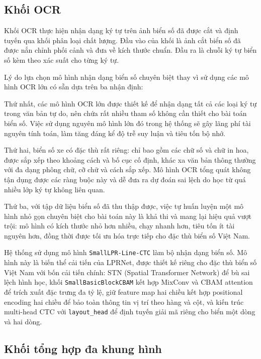 \documentclass[../DoAn.tex]{subfiles}
\begin{document}
\subsection{Khối OCR}
\label{subsection:3.1.ocr}

Khối OCR thực hiện nhận dạng ký tự trên ảnh biển số đã được cắt và định tuyến qua khối phân loại chất lượng. Đầu vào của khối là ảnh cắt biển số đã được nắn chỉnh phối cảnh và đưa về kích thước chuẩn. Đầu ra là chuỗi ký tự biển số kèm theo xác suất cho từng ký tự.

Lý do lựa chọn mô hình nhận dạng biển số chuyên biệt thay vì sử dụng các mô hình OCR lớn có sẵn dựa trên ba nhận định:

Thứ nhất, các mô hình OCR lớn được thiết kế để nhận dạng tất cả các loại ký tự trong văn bản tự do, nên chứa rất nhiều tham số không cần thiết cho bài toán biển số. Việc sử dụng nguyên mô hình lớn đó trong hệ thống sẽ gây lãng phí tài nguyên tính toán, làm tăng đáng kể độ trễ suy luận và tiêu tốn bộ nhớ.

Thứ hai, biển số xe có đặc thù rất riêng: chỉ bao gồm các chữ số và chữ in hoa, được sắp xếp theo khoảng cách và bố cục cố định, khác xa văn bản thông thường với đa dạng phông chữ, cỡ chữ và cách sắp xếp. Mô hình OCR tổng quát không tận dụng được các ràng buộc này và dễ đưa ra dự đoán sai lệch do học từ quá nhiều lớp ký tự không liên quan.

Thứ ba, với tập dữ liệu biển số đã thu thập được, việc tự huấn luyện một mô hình nhỏ gọn chuyên biệt cho bài toán này là khả thi và mang lại hiệu quả vượt trội: mô hình có kích thước nhỏ hơn nhiều, chạy nhanh hơn, tiêu tốn ít tài nguyên hơn, đồng thời được tối ưu hóa trực tiếp cho đặc thù biển số Việt Nam.

Hệ thống sử dụng mô hình \texttt{SmallLPR-Line-CTC} làm bộ nhận dạng biển số. Mô hình này là biến thể cải tiến của LPRNet, được thiết kế riêng cho đặc thù biển số Việt Nam với bốn cải tiến chính: STN (Spatial Transformer Network) để bù sai lệch hình học, khối \texttt{SmallBasicBlockCBAM} kết hợp MixConv và CBAM attention để trích xuất đặc trưng đa tỷ lệ, giữ feature map hai chiều kết hợp positional encoding hai chiều để bảo toàn thông tin vị trí theo hàng và cột, và kiến trúc multi-head CTC với \texttt{layout\_head} để định tuyến giải mã riêng cho biển một dòng và hai dòng.

\subsection{Khối tổng hợp đa khung hình}
\end{document}

